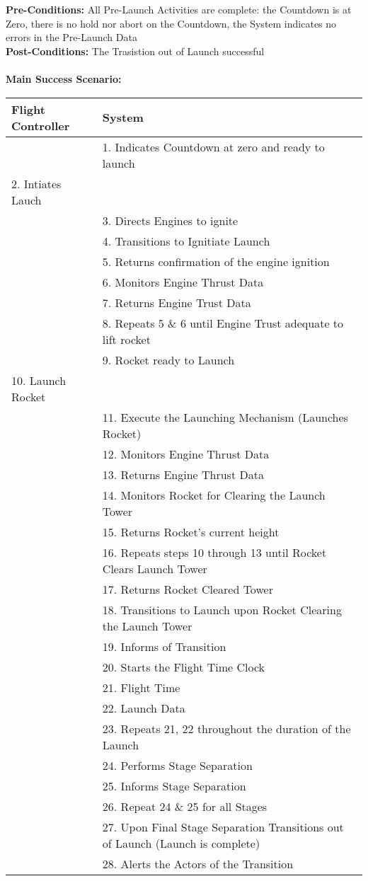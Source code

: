 \documentclass[letterpaper]{article}
\begin{document}
\textbf{Pre-Conditions:  }All Pre-Launch Activities are complete:  the
Countdown is at Zero, there is no hold nor abort on the Countdown, the
System indicates no errors in the Pre-Launch Data\\
\textbf{Post-Conditions:  }The Trasistion out of Launch successful\\\\
\textbf{Main Success Scenario:  }\\
\begin{tabular}{|p{5.75cm}|p{5.75cm}|}\hline
\textbf{Flight Controller} & \textbf{System}\\\hline
&1.  Indicates Countdown at zero and ready to launch\\\hline
2. Intiates Lauch & \\\hline
& 3.  Directs Engines to ignite\\\hline
& 4.  Transitions to Ignitiate Launch\\\hline
& 5.  Returns confirmation of the engine ignition\\\hline
& 6.  Monitors Engine Thrust Data\\\hline
& 7.  Returns Engine Trust Data\\\hline
& 8.  Repeats 5 \& 6 until Engine Trust adequate to lift
rocket\\\hline
& 9.  Rocket ready to Launch\\\hline
10. Launch Rocket &\\\hline
& 11.   Execute the Launching Mechanism (Launches Rocket)\\\hline
& 12.  Monitors Engine Thrust Data\\\hline
& 13.  Returns Engine Thrust Data\\\hline
& 14.  Monitors Rocket for Clearing the Launch Tower\\\hline
& 15.  Returns Rocket's current height\\\hline
& 16.  Repeats steps 10 through 13 until Rocket Clears Launch
Tower\\\hline
& 17.  Returns Rocket Cleared Tower\\\hline
& 18.  Transitions to Launch upon Rocket Clearing the Launch
Tower\\\hline
& 19.  Informs of Transition\\\hline 
& 20.  Starts the Flight Time Clock\\\hline
& 21.  Flight Time\\\hline
& 22.  Launch Data\\\hline
& 23.  Repeats 21, 22 throughout the duration of the Launch\\\hline
& 24.  Performs Stage Separation\\\hline
& 25.  Informs Stage Separation\\\hline
& 26.  Repeat 24 \& 25 for all Stages\\\hline
& 27. Upon Final Stage Separation Transitions out of Launch (Launch is
complete)\\\hline
& 28. Alerts the Actors of the Transition\\\hline
\end{tabular}\\\\
\end{document}
